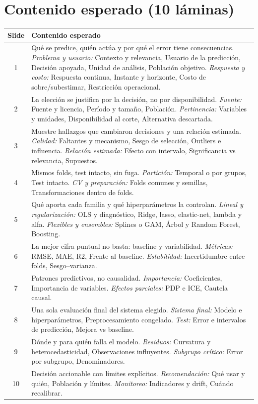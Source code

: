\documentclass[11pt,letterpaper]{article}
\begin{document}
\section*{Contenido esperado (10 láminas)}
\begin{center}\small
\begin{tabular}{c p{13.2cm}}
\toprule
Slide & Contenido esperado \\
\midrule
1 & Qué se predice, quién actúa y por qué el error tiene consecuencias. \emph{Problema y usuario:} Contexto y relevancia, Usuario de la predicción, Decisión apoyada, Unidad de análisis, Población objetivo. \emph{Respuesta y costo:} Respuesta continua, Instante y horizonte, Costo de sobre/subestimar, Restricción operacional. \\
2 & La elección se justifica por la decisión, no por disponibilidad. \emph{Fuente:} Fuente y licencia, Período y tamaño, Población. \emph{Pertinencia:} Variables y unidades, Disponibilidad al corte, Alternativa descartada. \\
3 & Muestre hallazgos que cambiaron decisiones y una relación estimada. \emph{Calidad:} Faltantes y mecanismo, Sesgo de selección, Outliers e influencia. \emph{Relación estimada:} Efecto con intervalo, Significancia vs relevancia, Supuestos. \\
4 & Mismos folds, test intacto, sin fuga. \emph{Partición:} Temporal o por grupos, Test intacto. \emph{CV y preparación:} Folds comunes y semillas, Transformaciones dentro de folds. \\
5 & Qué aporta cada familia y qué hiperparámetros la controlan. \emph{Lineal y regularización:} OLS y diagnóstico, Ridge, lasso, elastic-net, lambda y alfa. \emph{Flexibles y ensembles:} Splines o GAM, Árbol y Random Forest, Boosting. \\
6 & La mejor cifra puntual no basta: baseline y variabilidad. \emph{Métricas:} RMSE, MAE, R2, Frente al baseline. \emph{Estabilidad:} Incertidumbre entre folds, Sesgo--varianza. \\
7 & Patrones predictivos, no causalidad. \emph{Importancia:} Coeficientes, Importancia de variables. \emph{Efectos parciales:} PDP e ICE, Cautela causal. \\
8 & Una sola evaluación final del sistema elegido. \emph{Sistema final:} Modelo e hiperparámetros, Preprocesamiento congelado. \emph{Test:} Error e intervalos de predicción, Mejora vs baseline. \\
9 & Dónde y para quién falla el modelo. \emph{Residuos:} Curvatura y heterocedasticidad, Observaciones influyentes. \emph{Subgrupo crítico:} Error por subgrupo, Denominadores. \\
10 & Decisión accionable con límites explícitos. \emph{Recomendación:} Qué usar y quién, Población y límites. \emph{Monitoreo:} Indicadores y drift, Cuándo recalibrar. \\
\bottomrule
\end{tabular}\end{center}
\end{document}
